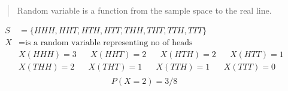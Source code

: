 \begin{slide}
  \begin{quote}
  Random variable is a function from the sample space to the real line.
  \end{quote}
  \begin{align*}
    S &= \{HHH, HHT, HTH , HTT, THH, THT, TTH,  TTT\}\\
    X &= \text{is a random variable representing no of heads}\\
    &X(HHH) = 3\hspace{20pt} 
    X(HHT) = 2 \hspace{20pt}
    X(HTH) = 2\hspace{20pt}
    X(HTT) = 1\\
    &X(THH) = 2\hspace{20pt}
    X(THT) = 1\hspace{20pt}
    X(TTH) = 1\hspace{20pt}
    X(TTT) = 0\\
   \end{align*}
     $$P(X=2) = 3/8$$
\end{slide}


